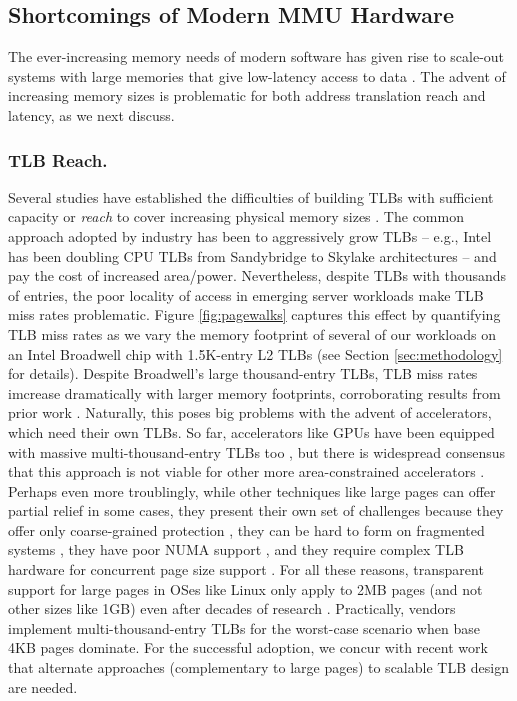 \subsection{Shortcomings of Modern MMU Hardware}
The ever-increasing memory needs of modern software has given rise to
scale-out systems with large memories that give low-latency access to
data \cite{ferdman:clearing, karakostas:performance, volos:fat,
  basu:efficient}. The advent of increasing memory sizes is
problematic for both address translation reach and latency, as we next
discuss.

\subsubsection{TLB Reach.}
Several studies have established the difficulties of building TLBs
with sufficient capacity or {\it reach} to cover increasing physical
memory sizes \cite{basu:efficient, haria:devirtualizing,
  pham:colt}. The common approach adopted by industry has been to
aggressively grow TLBs -- e.g., Intel has been doubling CPU TLBs from
Sandybridge to Skylake architectures -- and pay the cost of increased
area/power. Nevertheless, despite TLBs with thousands of entries, the
poor locality of access in emerging server workloads make TLB miss
rates problematic. Figure \ref{fig:pagewalks} captures this effect by
quantifying TLB miss rates as we vary the memory footprint of several
of our workloads on an Intel Broadwell chip with 1.5K-entry L2 TLBs
(see Section \ref{sec:methodology} for details). Despite Broadwell's
large thousand-entry TLBs, TLB miss rates imcrease dramatically with
larger memory footprints, corroborating results from prior work
\cite{basu:efficient}. Naturally, this poses big problems with the
advent of accelerators, which need their own TLBs. So far,
accelerators like GPUs have been equipped with massive
multi-thousand-entry TLBs too \cite{vesely:observation,
  lowepower:inferring}, but there is widespread consensus that this
approach is not viable for other more area-constrained accelerators
\cite{haria:devirtualizing, picorel:near-memory}. Perhaps even more
troublingly, while other techniques like large pages can offer partial
relief in some cases, they present their own set of challenges because
they offer only coarse-grained protection \cite{pham:large}, they can
be hard to form on fragmented systems \cite{kwon:coordinated}, they
have poor NUMA support \cite{gaud:large}, and they require complex TLB
hardware for concurrent page size support \cite{cox:efficient}. For
all these reasons, transparent support for large pages in OSes like
Linux only apply to 2MB pages (and not other sizes like 1GB) even
after decades of research \cite{arcangeli:transparent}.  Practically,
vendors implement multi-thousand-entry TLBs for the worst-case
scenario when base 4KB pages dominate. For the successful adoption, we
concur with recent work \cite{pham:colt, basu:efficient,
  karakostas:redundant, haria:devirtualizing} that alternate
approaches (complementary to large pages) to scalable TLB design are
needed.

